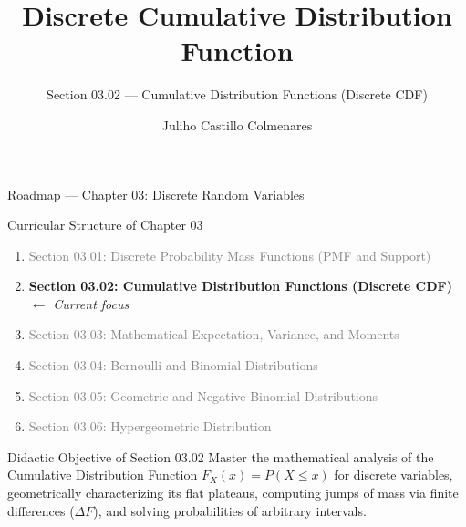 \documentclass[aspectratio=169,xcolor={dvipsnames,table}]{beamer}
\title{Discrete Cumulative Distribution Function}
\subtitle{Section 03.02 --- Cumulative Distribution Functions (Discrete CDF)}
\author[J. Castillo Colmenares]{Juliho Castillo Colmenares}
\institute[Tec de Monterrey]{Tecnológico de Monterrey}
\date{}
\begin{document}
\begin{frame}[plain]
	\titlepage
\end{frame}

\begin{frame}{Roadmap --- Chapter 03: Discrete Random Variables}
	\begin{block}{Curricular Structure of Chapter 03}
		\small
		\begin{enumerate}
			\itemsep=0.04cm
			\item \textcolor{gray}{Section 03.01: Discrete Probability Mass Functions (PMF and Support)}
			\item \textbf{\textcolor{TecRojo}{Section 03.02: Cumulative Distribution Functions (Discrete CDF)}} $\leftarrow$ \emph{Current focus}
			\item \textcolor{gray}{Section 03.03: Mathematical Expectation, Variance, and Moments}
			\item \textcolor{gray}{Section 03.04: Bernoulli and Binomial Distributions}
			\item \textcolor{gray}{Section 03.05: Geometric and Negative Binomial Distributions}
			\item \textcolor{gray}{Section 03.06: Hypergeometric Distribution}
		\end{enumerate}
	\end{block}
	\vspace{-0.15cm}
	\begin{alertblock}{Didactic Objective of Section 03.02}
		\footnotesize
		Master the mathematical analysis of the Cumulative Distribution Function $F_X(x) = P(X \le x)$ for discrete variables, geometrically characterizing its flat plateaus, computing jumps of mass via finite differences ($\Delta F$), and solving probabilities of arbitrary intervals.
	\end{alertblock}
\end{frame}
\end{document}

